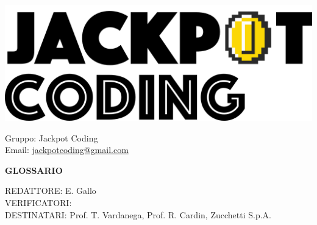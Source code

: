 \documentclass[5pt]{article}
\begin{document}
\begin{minipage}[t]{0.50\textwidth}
    \begin{flushleft}
        \hspace{10pt}
        \includegraphics[scale=0.65]{jackpot-logo.png} 
    \end{flushleft}
\end{minipage}
\hspace{-60pt} %
\begin{flushright}
    \begin{minipage}[t]{0.50\textwidth}
        \begin{flushright}
            Gruppo: {\Large Jackpot Coding}\\
            Email: \href{mailto:jackpotcoding@gmail.com}{jackpotcoding@gmail.com}
        \end{flushright}
    \end{minipage}
\end{flushright}

\vspace{24pt}

\begin{center}
    \textbf{\LARGE GLOSSARIO}
\end{center}

\vspace{13pt}

\begin{flushleft}
    \begin{spacing}{1.5}
        REDATTORE: E. Gallo\\%
        VERIFICATORI: \\
        \vspace{7pt}
        DESTINATARI: Prof. T. Vardanega, Prof. R. Cardin, Zucchetti S.p.A.\\%
    \end{spacing}
\end{flushleft}
\end{document}
